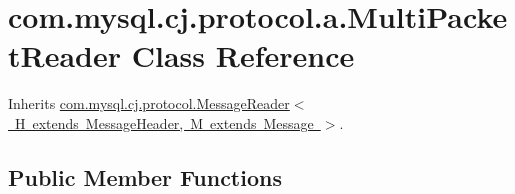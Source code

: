\hypertarget{classcom_1_1mysql_1_1cj_1_1protocol_1_1a_1_1_multi_packet_reader}{}\section{com.\+mysql.\+cj.\+protocol.\+a.\+Multi\+Packet\+Reader Class Reference}
\label{classcom_1_1mysql_1_1cj_1_1protocol_1_1a_1_1_multi_packet_reader}


Inherits \mbox{\hyperlink{interfacecom_1_1mysql_1_1cj_1_1protocol_1_1_message_reader}{com.\+mysql.\+cj.\+protocol.\+Message\+Reader$<$ H extends Message\+Header, M extends Message $>$}}.

\subsection*{Public Member Functions}
